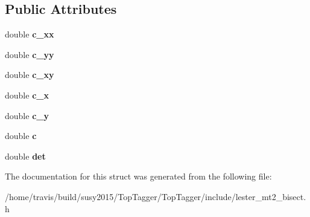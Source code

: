 \subsection*{Public Attributes}
\begin{DoxyCompactItemize}
\item 
\hypertarget{structLester_1_1EllipseParams_a95afe64aa1687111e1317fa4045fc55c}{double {\bfseries c\-\_\-xx}}\label{structLester_1_1EllipseParams_a95afe64aa1687111e1317fa4045fc55c}

\item 
\hypertarget{structLester_1_1EllipseParams_a494ff14d11c07b4428bca666ea8343b3}{double {\bfseries c\-\_\-yy}}\label{structLester_1_1EllipseParams_a494ff14d11c07b4428bca666ea8343b3}

\item 
\hypertarget{structLester_1_1EllipseParams_a4f0a5a453728e503760325677c01b713}{double {\bfseries c\-\_\-xy}}\label{structLester_1_1EllipseParams_a4f0a5a453728e503760325677c01b713}

\item 
\hypertarget{structLester_1_1EllipseParams_a6c0631a050a6564c804c35aea4997c29}{double {\bfseries c\-\_\-x}}\label{structLester_1_1EllipseParams_a6c0631a050a6564c804c35aea4997c29}

\item 
\hypertarget{structLester_1_1EllipseParams_a8b000ff58e2ff2511da0f6234e191e6e}{double {\bfseries c\-\_\-y}}\label{structLester_1_1EllipseParams_a8b000ff58e2ff2511da0f6234e191e6e}

\item 
\hypertarget{structLester_1_1EllipseParams_a86dd4c4bad1eee26d81071efa1137114}{double {\bfseries c}}\label{structLester_1_1EllipseParams_a86dd4c4bad1eee26d81071efa1137114}

\item 
\hypertarget{structLester_1_1EllipseParams_ad777140c2b6da121e1fa322b76b12a9e}{double {\bfseries det}}\label{structLester_1_1EllipseParams_ad777140c2b6da121e1fa322b76b12a9e}

\end{DoxyCompactItemize}


The documentation for this struct was generated from the following file\-:\begin{DoxyCompactItemize}
\item 
/home/travis/build/susy2015/\-Top\-Tagger/\-Top\-Tagger/include/lester\-\_\-mt2\-\_\-bisect.\-h\end{DoxyCompactItemize}
